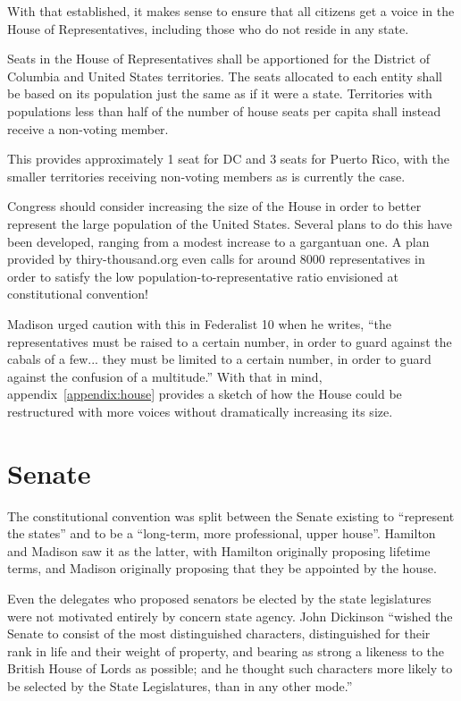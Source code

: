 \documentclass{article}
\newcommand{\quotes}[1]{``#1''}
\begin{document}
With that established, it makes sense to ensure that all citizens get a voice in the House of Representatives, including those who do not reside in any state.

\begin{quoting}
Seats in the House of Representatives shall be apportioned for the District of Columbia and United States territories. The seats allocated to each entity shall be based on its population just the same as if it were a state. Territories with populations less than half of the number of house seats per capita shall instead receive a non-voting member.
\end{quoting}

This provides approximately 1 seat for DC and 3 seats for Puerto Rico, with the smaller territories receiving non-voting members as is currently the case.

Congress should consider increasing the size of the House in order to better represent the large population of the United States. Several plans to do this have been developed, ranging from a modest increase to a gargantuan one\cite{Allen}. A plan provided by thiry-thousand.org even calls for around 8000 representatives in order to satisfy the low population-to-representative ratio envisioned at constitutional convention\cite{30000}!

Madison urged caution with this in Federalist 10 when he writes, \quotes{the representatives must be raised to a certain number, in order to guard against the cabals of a few... they must be limited to a certain number, in order to guard against the confusion of a multitude.}\cite{Federalist10} With that in mind, appendix~\ref{appendix:house} provides a sketch of how the House could be restructured with more voices without dramatically increasing its size.

\section{Senate}
\label{section:Senate}

The constitutional convention was split between the Senate existing to \quotes{represent the states} and to be a \quotes{long-term, more professional, upper house}. Hamilton and Madison saw it as the latter, with Hamilton originally proposing lifetime terms, and Madison originally proposing that they be appointed by the house.

Even the delegates who proposed senators be elected by the state legislatures were not motivated entirely by concern state agency. John Dickinson \quotes{wished the Senate to consist of the most distinguished characters, distinguished for their rank in life and their weight of property, and bearing as strong a likeness to the British House of Lords as possible; and he thought such characters more likely to be selected by the State Legislatures, than in any other mode.}\cite{Madison}
\end{document}
